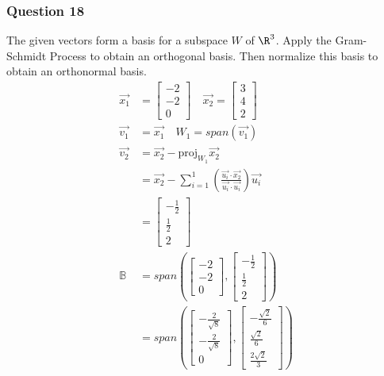 \documentclass{math}
\begin{document}
\subsubsection*{Question 18}
The given vectors form a basis for a subspace \( W \) of \( \R^3 \). Apply the
Gram-Schmidt Process to obtain an orthogonal basis. Then normalize this basis
to obtain an orthonormal basis.
\begin{align*}
  \vec{x_1} &= \begin{bmatrix}-2 \\ -2 \\ 0\end{bmatrix} \quad
    \vec{x_2} = \begin{bmatrix}3 \\ 4 \\ 2\end{bmatrix} \\
  \vec{v_1} &= \vec{x_1} \quad W_1 = span(\vec{v_1}) \\
  \vec{v_2} &= \vec{x_2}-\text{proj}_{W_1}\vec{x_2} \\
  &= \vec{x_2}-\sum_{i=1}^{1}
    \left(\frac{\vec{u_i}\cdot\vec{x_2}}{\vec{u_i}\cdot\vec{u_i}}\right)
    \vec{u_i} \\
  &= \begin{bmatrix}-\frac{1}{2} \\ \frac{1}{2} \\ 2\end{bmatrix} \\
  \mathbb{B} &= span\left(
    \begin{bmatrix}-2 \\ -2 \\ 0\end{bmatrix},
    \begin{bmatrix}-\frac{1}{2} \\ \frac{1}{2} \\ 2\end{bmatrix}
  \right) \\
  &= span\left(
    \begin{bmatrix}-\frac{2}{\sqrt{8}} \\ -\frac{2}{\sqrt{8}} \\ 0\end{bmatrix},
    \begin{bmatrix}-\frac{\sqrt{2}}{6} \\ \frac{\sqrt{2}}{6} \\
      \frac{2\sqrt{2}}{3}\end{bmatrix}
  \right)
\end{align*}
\end{document}
